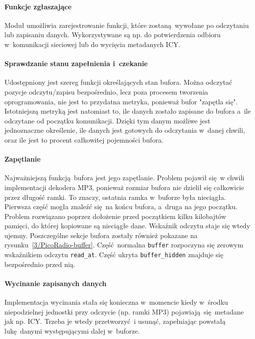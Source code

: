 \documentclass[polish]{aghengthesis}
\begin{document}
		\paragraph{Funkcje zgłaszające}
			Moduł umożliwia zarejestrowanie funkcji, które zostaną wywołane po odczytaniu lub zapisaniu danych. Wykorzystywane są np. do potwierdzenia odbioru w~komunikacji sieciowej lub do wycięcia metadanych ICY.
		
		\paragraph{Sprawdzanie stanu zapełnienia i~czekanie}
			Udostępniony jest szereg funkcji określających stan bufora. Można odczytać pozycje odczytu/zapisu bezpośrednio, lecz poza procesem tworzenia oprogramowania, nie jest to przydatna metryka, ponieważ bufor "zapętla się". Istotniejszą metryką jest natomiast to, ile danych zostało zapisane do bufora a~ile odczytane od początku komunikacji. Dzięki tym danym możliwe jest jednoznaczne określenie, ile danych jest gotowych do odczytania w~danej chwili, oraz ile jest to procent całkowitej pojemności bufora.
		
		\paragraph{Zapętlanie}
			Najważniejszą funkcją bufora jest jego zapętlanie. Problem pojawił się w chwili implementacji dekodera MP3, ponieważ rozmiar bufora nie dzielił się całkowicie przez długość ramki. To znaczy, ostatnia ramka w~buforze była nieciągła. Pierwsza część mogła znaleźć się na końcu bufora, a~druga na jego początku. Problem rozwiązano poprzez dołożenie przed początkiem kilku kilobajtów pamięci, do której kopiowane są nieciągłe dane. Wskaźnik odczytu staje się wtedy ujemny. Poszczególne sekcje bufora zostały również pokazane na rysunku~\ref{3/PicoRadio-buffer}. Część normalna \lstinline|buffer| rozpoczyna się zerowym wskaźnikiem odczytu \lstinline|read_at|. Część ukryta \lstinline|buffer_hidden| znajduje się bezpośrednio przed nią.
		
		\paragraph{Wycinanie zapisanych danych}
			Implementacja wycinania stała się konieczna w~momencie kiedy w~środku niepodzielnej jednostki przy odczycie (np. ramki MP3) pojawiają się metadane jak np. ICY. Trzeba je wtedy przetworzyć i usunąć, zapełniając powstałą lukę danymi występującymi dalej w~buforze.
	
\end{document}
